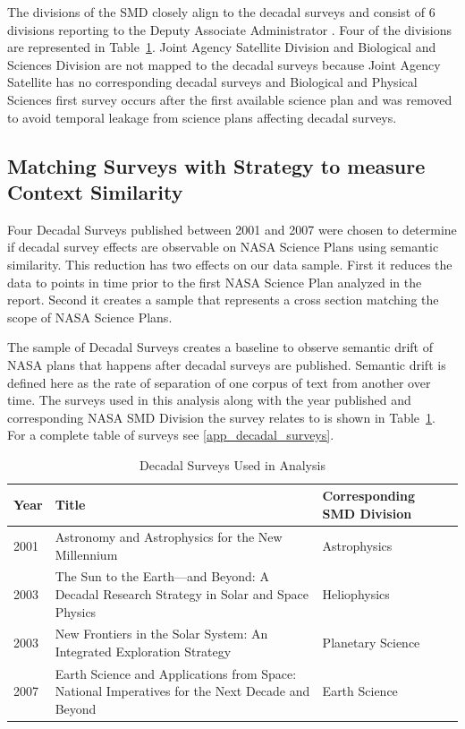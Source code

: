 \documentclass[preprint,12pt]{elsarticle}
\begin{document}
 The divisions of the SMD closely align to the decadal surveys and consist of 6 divisions reporting to the Deputy Associate Administrator \cite{NASA_SMD}. Four of the divisions are represented in Table~\ref{tab:decadals_used}. Joint Agency Satellite Division and Biological and Sciences Division are not mapped to the decadal surveys because Joint Agency Satellite has no corresponding decadal surveys and Biological and Physical Sciences first survey occurs after the first available science plan and was removed to avoid temporal leakage from science plans affecting decadal surveys.  

\subsection{Matching Surveys with Strategy to measure Context Similarity}
Four Decadal Surveys published between 2001 and 2007 were chosen to determine if decadal survey effects are observable on NASA Science Plans using semantic similarity.  This reduction has two effects on our data sample. First it reduces the data to points in time prior to the first NASA Science Plan analyzed in the report. Second it creates a sample that represents a cross section matching the scope of NASA Science Plans. 

The sample of Decadal Surveys creates a baseline to observe semantic drift of NASA plans that happens after decadal surveys are published. Semantic drift is defined here as the rate of separation of one corpus of text from another over time. The surveys used in this analysis along with the year published and corresponding NASA SMD Division the survey relates to is shown in Table~\ref{tab:decadals_used}. For a complete table of surveys see \ref{app_decadal_surveys}.

\begin{table}[H]
\centering
\begin{tabular}{p{1.2cm} p{7.5cm} p{3.5cm}}
 \hline
 \rowcolor[gray]{0.95}
 \textbf{Year} & \textbf{Title} & \textbf{Corresponding SMD Division} \\ \hline
 2001 & Astronomy and Astrophysics for the New Millennium & Astrophysics \\
 \rowcolor[gray]{0.97}
 2003 & The Sun to the Earth—and Beyond: A Decadal Research Strategy in Solar and Space Physics & Heliophysics \\
 2003 & New Frontiers in the Solar System: An Integrated Exploration Strategy & Planetary  Science \\
 \rowcolor[gray]{0.97}
 2007 & Earth Science and Applications from Space: National Imperatives for the Next Decade and Beyond & Earth Science \\
\end{tabular}
\caption{Decadal Surveys Used in Analysis \cite{Academies_decadal, NASA_sci_strat}}\label{tab:decadals_used}
\end{table}
\end{document}
